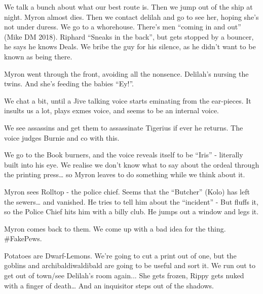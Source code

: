 We talk a bunch about what our best route is. Then we jump out of the ship at night. Myron almost dies. Then we contact delilah and go to see her, hoping she’s not under duress. We go to a whorehouse. There’s men “coming in and out” (Mike DM 2018). Riphard “Sneaks in the back”, but gets stopped by a bouncer, he says he knows Deals. We bribe the guy for his silence, as he didn’t want to be known as being there.\medskip

Myron went through the front, avoiding all the nonsence. Delilah’s nursing the twins. And she’s feeding the babies “Ey!”.\medskip

We chat a bit, until a Jive talking voice starts eminating from the ear-pieces. It insults us a lot, plays exmes voice, and seems to be an internal voice.\medskip

We see assassins and get them to assassinate Tigerius if ever he returns. The voice judges Burnie and co with this.\medskip

We go to the Book burners, and the voice reveals itself to be “Iris” - literally built into his eye. We realise we don’t know what to say about the ordeal through the printing press… so Myron leaves to do something while we think about it.\medskip

Myron sees Rolltop - the police chief. Seems that the “Butcher” (Kolo) has left the sewers… and vanished. He tries to tell him about the “incident” - But fluffs it, so the Police Chief hits him with a billy club. He jumps out a window and legs it.\medskip

Myron comes back to them. We come up with a bad idea for the thing. \#FakePews.\medskip

Potatoes are Dwarf-Lemons. We’re going to cut a print out of one, but the goblins and archibaldiwaldibald are going to be useful and sort it. We run out to get out of town/see Delilah’s room again... She gets frozen, Rippy gets nuked with a finger of death… And an inquisitor steps out of the shadows.\medskip

\vspace*{5mm}

